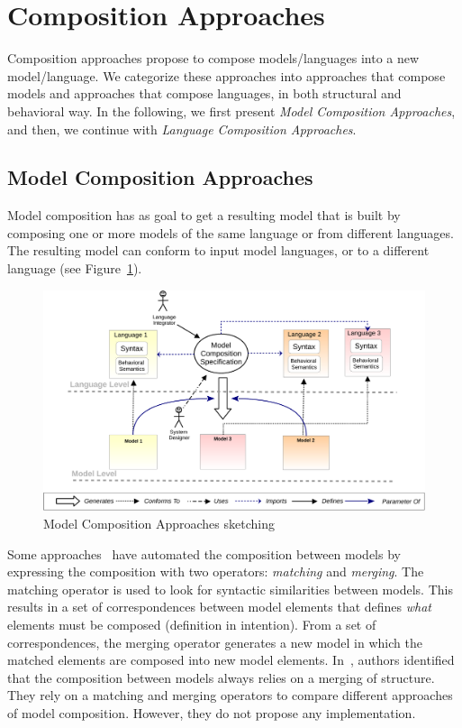 \section{Composition Approaches}
Composition approaches propose to compose models/languages into a new model/language. We categorize these approaches into approaches that compose models and approaches that compose languages, in both structural and behavioral way. In the following, we first present \emph{Model Composition Approaches}, and then, we continue with \emph{Language Composition Approaches}.
 
\subsection{Model Composition Approaches}
Model composition has as goal to get a resulting model that is built by composing one or more models of the same language or from different languages. The resulting model can conform to input model languages, or to a different language (see Figure~\ref{fig:modelcompo}).

\begin{figure}
	\begin{center}
		\includegraphics[width=1\textwidth]{background/figs/modelcompo}
		\caption{Model Composition Approaches sketching}
		\label{fig:modelcompo}
	\end{center}
\end{figure}

Some approaches~\cite{mergemanifest,epsilon,kompose} have automated the composition between models by expressing the composition with two operators: \emph{matching} and \emph{merging}. The matching operator is used to look for syntactic similarities between models. This results in a set of correspondences between model elements that defines \emph{what} elements must be composed (definition in intention). From a set of correspondences, the merging operator generates a new model in which the matched elements are composed into new model elements. In~\cite{mergemanifest}, authors identified that the composition between models always relies on a merging of structure. They rely on a matching and merging operators to compare different approaches of model composition. However, they do not propose any implementation.

